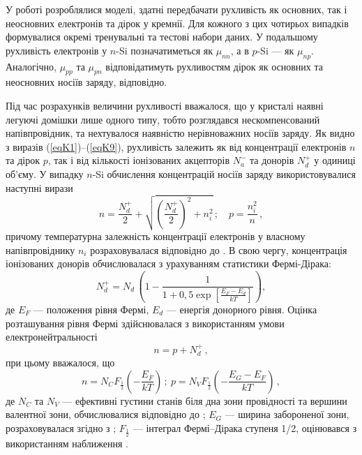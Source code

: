 \documentclass[fleqn,twoside,twocolumn,nofootinbib,showkeys]{revtex4} %
\begin{document}
У роботі розроблялися моделі, здатні передбачати рухливість як основних, так і неосновних електронів та дірок у кремнії.
Для кожного з цих чотирьох випадків формувалися окремі тренувальні та тестові набори даних.
У подальшому рухливість електронів у $n$-Si позначатиметься як $\mu_{nn}$,
а в $p$-Si --- як $\mu_{np}$.
Аналогічно, $\mu_{pp}$ та $\mu_{pn}$ відповідатимуть рухливостям дірок як основних та неосновних носіїв заряду, відповідно.

Під час розрахунків величини рухливості вважалося, що у кристалі наявні легуючі домішки лише одного типу,
тобто розглядався нескомпенсований напівпровідник, та
нехтувалося наявністю нерівноважних носіїв заряду.
Як видно з виразів (\ref{eqK1})–(\ref{eqK9}), рухливість залежить як від концентрації електронів $n$
та дірок $p$, так і від кількості іонізованих акцепторів $N_a^-$ та донорів $N_d^+$ у одиниці об'єму.
У випадку $n$-Si обчислення концентрацій носіїв заряду використовувалися наступні вирази
\begin{equation}
 \label{eqn}
  n = \frac{N_d^+}{2}+\sqrt{\left(\frac{N_d^+}{2}\right)^2+n_i^2}\,;\quad p = \frac{n_i^2}{n}\,,
\end{equation}
причому температурна залежність концентрації електронів у власному напівпровіднику
$n_i$ розраховувалася відповідно до \cite{Si_ni_Couderc}.
В свою чергу, концентрація іонізованих донорів обчислювалася з урахуванням статистики Фермі-Дірака:
\begin{equation}\label{eqNd}
  N_d^+=N_d\,\left(1-\frac{1}{1+0,5\exp\left[\frac{E_F-E_d}{kT}\right]}\right),
\end{equation}
де
$E_F$ --- положення рівня Фермі,
$E_d$ --- енергія донорного рівня.
Оцінка розташування рівня Фермі здійснювалася з використанням умови електронейтральності
\begin{equation}\label{eqEN}
  n=p+N_d^+\,,
\end{equation}
при цьому вважалося, що
\begin{equation}\label{eqFD}
  n\! =\! N_C F_\frac{1}{2}\left(-\frac{E_F}{kT}\right)\,;\: p\! =\! N_V F_\frac{1}{2}\left(-\frac{E_G-E_F}{kT}\right)\,,
\end{equation}
де
$N_C$ та $N_V$ --- ефективні густини станів біля дна зони провідності та вершини валентної зони,
обчислювалися відповідно до \cite{Si_ni_Couderc};
$E_G$ --- ширина забороненої зони, розраховувалася згідно з \cite{Passler2002};
$F_\frac{1}{2}$ --- інтеграл Фермі--Дірака ступеня 1/2, оцінювався з використанням наближення \cite{AlQurashi2018}.
\end{document}
